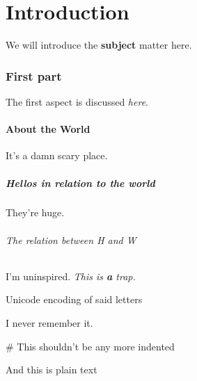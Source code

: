 \documentclass{article}
\begin{document}
\part*{Introduction}

We will introduce the \textbf{subject} matter here.

\section*{First part}

The first aspect is discussed \textit{here}.

\subsection*{About the World}

It's a damn scary place.

\subsubsection*{Hellos in relation to the world}

They're huge.

\paragraph{The relation between H and W}\mbox{}\newline

I'm uninspired. \textit{This is \textbf{a} trap.}

\subparagraph{Unicode encoding of said letters}\mbox{}\newline

I never remember it.

\subparagraph{\# This shouldn't be any more indented}\mbox{}\newline

And this is plain text
\end{document}

